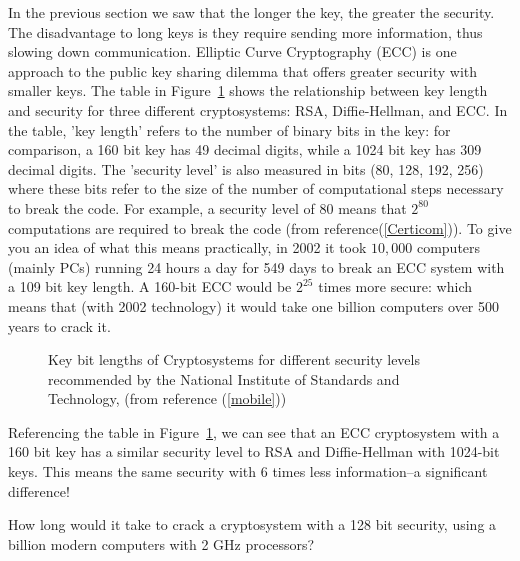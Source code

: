 In the previous section we saw that the longer the key, the greater the security. The disadvantage to long keys is they require sending more information, thus slowing down communication.  Elliptic Curve Cryptography (ECC) is one approach to the public key sharing dilemma that offers greater security with smaller keys. The table in Figure~\ref{fig:DH:DHKE_9} shows the relationship between key length and security for three different cryptosystems: RSA, Diffie-Hellman, and ECC.  In the table, 'key length' refers to the number of binary bits in the key: for comparison, a 160 bit key has 49 decimal digits, while a 1024 bit key has 309 decimal digits. The 'security level' is also measured in bits (80, 128, 192, 256) where these bits refer to the size of the number of computational steps necessary to break the code.  For example, a security level of 80 means that $2^{80}$ computations are required to break the code (from reference(\ref{Certicom})). To give you an idea of what this means practically, in 2002 it took $10,000$ computers (mainly PCs) running 24 hours a day for 549 days to break an ECC system with a 109 bit key length. A 160-bit ECC would be $2^{25}$ times more secure: which means that (with 2002 technology) it would take one billion computers over 500 years to crack it.
\begin{figure} [H]
	  \caption{\label{fig:DH:DHKE_9}Key bit lengths of Cryptosystems for different security levels recommended by the National Institute of Standards and Technology, (from reference (\ref{mobile}))}
\end{figure}
Referencing the table in Figure~\ref{fig:DH:DHKE_9}, we can see that an ECC cryptosystem with a 160 bit key has a similar security level to RSA and Diffie-Hellman with 1024-bit keys. This means the same security with 6 times less information--a significant difference! 

\begin{exercise}{}
How long would it take to crack a cryptosystem with a 128 bit security, using a billion modern computers with 2 GHz processors?
\end{exercise}

